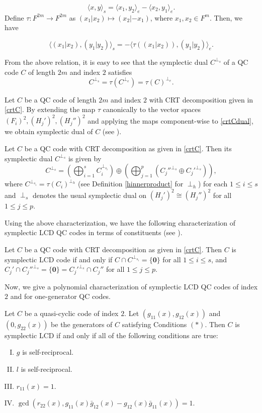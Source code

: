 \documentclass[a4paper,12pt]{article}
\begin{document}
 $$\langle x,y\rangle_s=\langle x_1,y_2\rangle_e-\langle x_2,y_1\rangle_e.$$
 Define $\tau : F^{2m}\to F^{2m}$ as $(x_1|x_2)\mapsto (x_2|-x_1)$, where $x_1,x_2\in F^m$. Then, we have 
 
 $$\langle (x_1|x_2), (y_1|y_2)\rangle_s=-\langle \tau ((x_1|x_2)),(y_1|y_2)\rangle_e. $$
 
 From the above relation, it is easy to see that the symplectic dual $C^{\perp_s}$ of a QC code $C$ of length $2m$ and index $2$ satisfies $$C^{\perp_s}=\tau(C^{\perp_e})=\tau(C)^{\perp_e}.$$
 
 
 Let $C$ be a QC code of length $2m$ and index $2$ with CRT decomposition given in \eqref{crtC}. By  extending the map $\tau$  canonically to the vector spaces $(F_i)^2,(H_j')^2 , (H_j'')^2$ and applying the maps component-wise to \eqref{crtCdual}, we obtain  symplectic dual of $C$ (see \cite[Proposition V.1]{ezerman2025}).
 \begin{proposition}\label{slcdconst}
 	Let $C$ be a QC code with CRT decomposition as given in \eqref{crtC}. Then its symplectic dual $C^{\perp_s}$ is given by \begin{equation} \label{crtCsdual}
 		C^{\perp_s} = \left(\bigoplus_{i=1}^{s} C_i^{\perp_{s_i}} \right) 
 		\oplus
 		\left(\bigoplus_{j=1}^{p} \left(  C_j''^{\perp_s}
 		\oplus   C_j'^{\perp_s}   \right) \right),
 	\end{equation} 
 	where ${C^{\perp_{s_i}}}=\tau(C_i)^{\perp_h}$ (see Definition \eqref{hinnerproduct} for $\perp_h$) for each $1\le i \le s$ and $ \perp_s$ denotes the usual symplectic dual on $(H_j')^2 \cong (H_j'')^2$ for all $1\leq j\leq p$.
 \end{proposition}
Using the above characterization, we have the following characterization of symplectic LCD QC codes in terms of constituents (see \cite[Eq. V.7]{ezerman2025}). 
\begin{theorem}
		Let $C$ be a QC code with CRT decomposition as given in \eqref{crtC}. Then $C$ is symplectic LCD code if and only if $C\cap C^{\perp_{s_i}}=\{\mathbf{0}\}$ for all $1\leq i\leq s$, and $C_j'\cap C_j''^{\perp_s}=\{\mathbf{0}\}=C_j'^{\perp_s}\cap C_j''$ for all $1\leq j\leq p$.
\end{theorem}
Now, we give a polynomial characterization of symplectic LCD QC codes of index $2$ and for one-generator QC codes.

\begin{theorem} \label{slcdmain} 
Let $C$ be a quasi-cyclic code   of index $2$. Let $(g_{11}(x), g_{12}(x))$ and $(0, g_{22}(x))$ be the generators of $C$ satisfying Conditions $(\ast)$.   
		Then $C$ is symplectic LCD if and only if all of the following conditions are true:
		\begin{enumerate}[(I)]
			\item  $g$ is self-reciprocal.
			\item  $l$ is self-reciprocal. 
			\item  $r_{11}(x)=1$. 
			\item $\gcd(r_{22}(x), g_{11}(x)\bar{g}_{12}(x)-g_{12}(x) \bar{g}_{11}(x))=1$.
		\end{enumerate}
	\end{theorem}
\end{document}
